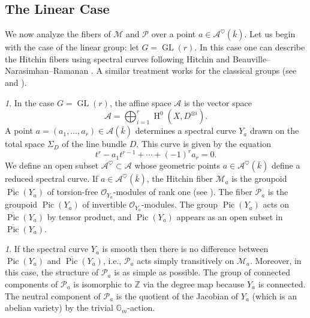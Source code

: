 \documentclass[12pt,english]{smfart}
\numberwithin{equation}{subsection}
\theoremstyle{remark}
\newtheorem{numero}[equation]{}
\begin{document}
\subsection{The Linear Case}\label{Cas lineaire}

We now analyze the fibers of $\mathcal{M}$ and $\mathcal{P}$ over a point $a\in\mathcal{A}^\heartsuit(\bar{k})$.
Let us begin with the case of the linear group: let $G=\operatorname{GL}(r)$. In this case one can describe
the Hitchin fibers using spectral curves following Hitchin \cite{H} and Beauville--Narasimhan--Ramanan \cite{BNR}.
A similar treatment works for the classical groups (see \cite{H} and \cite{compagnon}).

\begin{numero}
In the case $G=\operatorname{GL}(r)$, the affine space $\mathcal{A}$ is the vector space
$$
\mathcal{A}=\bigoplus_{i=1}^r \operatorname{H}^0(X, D^{\otimes i}).
$$
A point $a=(a_1,\ldots,a_r)\in\mathcal{A}(\bar{k})$ determines a spectral curve $Y_a$ drawn on the total space $\Sigma_D$ of the line bundle $D$.
This curve is given by the equation
$$
t^r-a_1t^{r-1}+\cdots+(-1)^r a_r=0.
$$
We define an open subset $\mathcal{A}^\heartsuit\subset \mathcal{A}$ whose geometric points $a\in \mathcal{A}^\heartsuit(\bar{k})$ define a reduced spectral curve.
If $a\in \mathcal{A}^\heartsuit(\bar{k})$, the Hitchin fiber $\mathcal{M}_a$ is the groupoid $\overline{\operatorname{Pic}}(Y_a)$ of torsion-free $\mathcal{O}_{Y_a}$-modules of rank one (see \cite{BNR}).
The fiber $\mathcal{P}_a$ is the groupoid $\operatorname{Pic}(Y_a)$ of invertible $\mathcal{O}_{Y_a}$-modules.
The group $\operatorname{Pic}(Y_a)$ acts on $\overline{\operatorname{Pic}}(Y_a)$ by tensor product, and $\operatorname{Pic}(Y_a)$ appears as an open subset in $\overline{\operatorname{Pic}}(Y_a)$.
\end{numero}

\begin{numero}
If the spectral curve $Y_a$ is smooth then there is no difference between $\operatorname{Pic}(Y_a)$ and $\overline{\operatorname{Pic}}(Y_a)$,
i.e., $\mathcal{P}_a$ acts simply transitively on $\mathcal{M}_a$. Moreover, in this case, the structure of $\mathcal{P}_a$ is as simple as possible.
The group of connected components of $\mathcal{P}_a$ is isomorphic to $\mathbb{Z}$ via the degree map because $Y_a$ is connected.
The neutral component of $\mathcal{P}_a$ is the quotient of the Jacobian of $Y_a$ (which is an abelian variety) by the trivial $\mathbb{G}_m$-action.
\end{numero}
\end{document}
